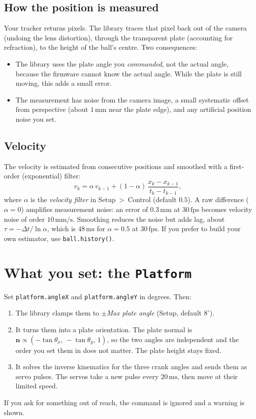 \documentclass[10pt,a4paper]{article}
\newcommand{\un}[1]{\,\mathrm{#1}}
\begin{document}
\subsection{How the position is measured}
Your tracker returns pixels. The library traces that pixel back out of the camera (undoing the
lens distortion), through the transparent plate (accounting for refraction), to the height of
the ball's centre. Two consequences:
\begin{itemize}
  \item The library uses the plate angle you \emph{commanded}, not the actual angle, because the
        firmware cannot know the actual angle. While the plate is still moving, this adds a small
        error.
  \item The measurement has noise from the camera image, a small systematic offset from
        perspective (about $1\un{mm}$ near the plate edge), and any artificial position noise you
        set.
\end{itemize}

\subsection{Velocity}\label{sec:velocity}
The velocity is estimated from consecutive positions and smoothed with a first-order
(exponential) filter:
\begin{equation}
  v_k=\alpha\,v_{k-1}+(1-\alpha)\,\frac{x_k-x_{k-1}}{t_k-t_{k-1}},
\end{equation}
where $\alpha$ is the \emph{velocity filter} in Setup~\textgreater~Control (default $0.5$). A
raw difference ($\alpha=0$) amplifies measurement noise: an error of $0.3\un{mm}$ at $30\un{fps}$
becomes velocity noise of order $10\un{mm/s}$. Smoothing reduces the noise but adds lag, about
$\tau=-\Delta t/\ln\alpha$, which is $48\un{ms}$ for $\alpha=0.5$ at $30\un{fps}$. If you prefer to
build your own estimator, use \texttt{ball.history()}.

\section{What you set: the \texttt{Platform}}
Set \texttt{platform.angleX} and \texttt{platform.angleY} in degrees. Then:
\begin{enumerate}
  \item The library clamps them to $\pm$\emph{Max plate angle} (Setup, default $8^\circ$).
  \item It turns them into a plate orientation. The plate normal is
        $\bm n\propto(-\tan\theta_x,\,-\tan\theta_y,\,1)$, so the two angles are independent and
        the order you set them in does not matter. The plate height stays fixed.
  \item It solves the inverse kinematics for the three crank angles and sends them as servo
        pulses. The servos take a new pulse every $20\un{ms}$, then move at their limited
        speed.
\end{enumerate}
If you ask for something out of reach, the command is ignored and a warning is shown.
\end{document}
